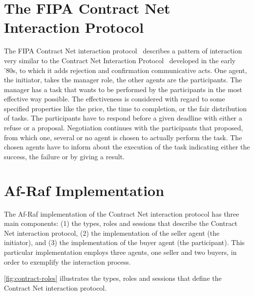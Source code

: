 \documentclass[a4paper,12pt,oneside,fleqn]{book} %
\begin{document}
\section{The FIPA Contract Net Interaction Protocol} %
The FIPA Contract Net interaction protocol~\cite{web:fipa} describes a
pattern of interaction very similar to the Contract Net Interaction
Protocol~\cite{DBLP:journals/tc/Smith80a} developed in the early
'80s, to which it adds rejection and confirmation communicative acts. One
agent, the initiator, takes the manager role, the other agents are the
participants. The manager has a task that wants to be performed by the
participants in the most effective way possible. The effectiveness is
considered with regard to some specified properties like the price, the
time to completion, or the fair distribution of tasks. The participants
have to respond before a given deadline with either a refuse or a proposal.
Negotiation continues with the participants that proposed, from which one,
several or no agent is chosen to actually perform the task. The chosen
agents have to inform about the execution of the task indicating either the
success, the failure or by giving a result.
\section{Af-Raf Implementation} %
The Af-Raf implementation of the Contract Net interaction protocol has
three main components: (1) the types, roles and sessions that describe the
Contract Net interaction protocol, (2) the implementation of the seller
agent (the initiator), and (3) the implementation of the buyer agent (the
participant). This particular implementation employs three agents, one
seller and two buyers, in order to exemplify the interaction process.

\autoref{fig:contract-roles} illustrates the types, roles and sessions that
define the Contract Net interaction protocol.
\end{document}
